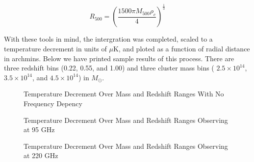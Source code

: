 \documentclass[12pt]{article} %
\begin{document}
\begin{equation}
R_{500} = (\frac{1500\pi M_{500}\rho_c}{4})^\frac{1}{3}
\end{equation}

With these tools in mind, the intergration was completed, scaled to a temperature decrement in units of $\mu$K, and ploted as a function of radial distance in archmins. Below we have printed sample results of this process. There are three redshift bins (0.22, 0.55, and 1.00) and three cluster mass bins ( $2.5\times 10^{14}$,  $3.5\times 10^{14}$, and  $4.5\times 10^{14}$) in $M_{\odot}$. 


\begin{figure}[!ht]
	\center
    \vfill
	\center
    \vfill
	\center
    \caption{Temperature Decrement Over Mass and Redshift Ranges With No Frequency Depency}
    \label{fig:dummy}
  \end{figure}

\begin{figure}[!ht]
	\center
    \vfill
	\center
    \vfill
	\center
    \caption{Temperature Decrement Over Mass and Redshift Ranges Observing at 95 GHz }
    \label{fig:dummy}
  \end{figure}

\begin{figure}[!ht]
	\center
    \vfill
	\center
    \vfill
	\center
    \caption{Temperature Decrement Over Mass and Redshift Ranges Observing at 220 GHz }
    \label{fig:dummy}
  \end{figure}
\end{document}
